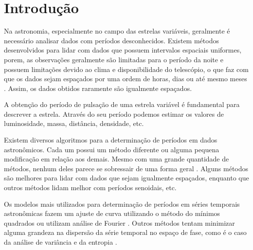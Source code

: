 \chapter{Introdu\c{c}ão}


Na astronomia, especialmente no campo das estrelas variáveis, geralmente é necessário analisar dados com períodos desconhecidos. Existem métodos desenvolvidos para lidar com dados que possuem intervalos espaciais uniformes, porem, as observa\c{c}ões geralmente são limitadas para o período da noite e possuem limita\c{c}ões devido ao clima e disponibilidade do telescópio, o que faz com que os dados sejam espa\c{c}ados por uma ordem de horas, dias ou até mesmo meses \citep{fer_mello}. Assim, os dados obtidos raramente são igualmente espaçados.


A obtenção do período de pulsação de uma estrela variável é fundamental para descrever a estrela. Através do seu período podemos estimar os valores de luminosidade, massa, distância, densidade, etc.


Existem diversos algoritmos para a determina\c{c}ão de períodos em dados astronômicos. Cada um possui um método diferente ou alguma pequena modifica\c{c}ão em rela\c{c}ão aos demais. Mesmo com uma grande quantidade de métodos, nenhum deles parece se sobressair de uma forma geral \citep{comparison}. Alguns métodos são melhores para lidar com dados que sejam igualmente espaçados, enquanto que outros métodos lidam melhor com períodos senoidais, etc.




Os modelos mais utilizados para determina\c{c}ão de períodos em séries temporais astronômicas fazem um ajuste de curva utilizando o método do mínimos quadrados \citep{lomb} ou utilizam análise de Fourier \citep{fer_mello}. Outros métodos tentam minimizar alguma grandeza na dispersão da série temporal no espa\c{c}o de fase, como é o caso da análise de variância \citep{aov} e da entropia \citep{entropy}.


